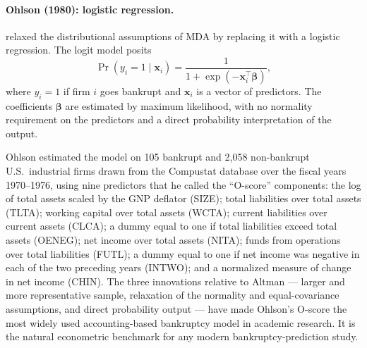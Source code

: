 \documentclass[11pt,a4paper]{article}
\begin{document}
\paragraph{Ohlson (1980): logistic regression.}
\cite{ohlson1980} relaxed the distributional assumptions of MDA by replacing
it with a logistic regression. The logit model posits
\begin{equation}
\Pr(y_i = 1 \mid \mathbf{x}_i) = \frac{1}{1 + \exp(-\mathbf{x}_i^\top \boldsymbol{\beta})},
\label{eq:logit}
\end{equation}
where $y_i = 1$ if firm $i$ goes bankrupt and $\mathbf{x}_i$ is a vector of
predictors. The coefficients $\boldsymbol{\beta}$ are estimated by maximum
likelihood, with no normality requirement on the predictors and a direct
probability interpretation of the output.

Ohlson estimated the model on 105 bankrupt and 2,058 non-bankrupt U.S.\
industrial firms drawn from the Compustat database over the fiscal years
1970--1976, using nine predictors that he called the ``O-score'' components:
the log of total assets scaled by the GNP deflator (SIZE); total liabilities
over total assets (TLTA); working capital over total assets (WCTA); current
liabilities over current assets (CLCA); a dummy equal to one if total
liabilities exceed total assets (OENEG); net income over total assets (NITA);
funds from operations over total liabilities (FUTL); a dummy equal to one if
net income was negative in each of the two preceding years (INTWO); and a
normalized measure of change in net income (CHIN). The three innovations
relative to Altman --- larger and more representative sample, relaxation of
the normality and equal-covariance assumptions, and direct probability output
--- have made Ohlson's O-score the most widely used accounting-based
bankruptcy model in academic research. It is the natural econometric
benchmark for any modern bankruptcy-prediction study.
\end{document}
